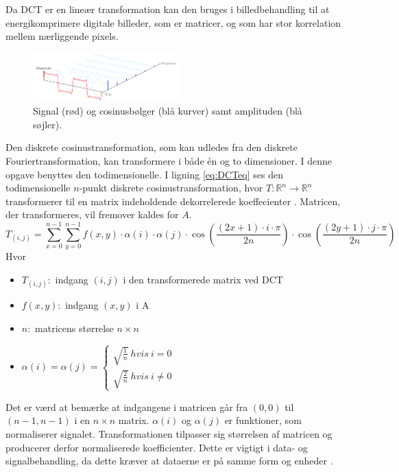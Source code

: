 Da DCT er en lineær transformation kan den bruges i billedbehandling til at energikomprimere digitale billeder, som er matricer, og som har stor korrelation mellem nærliggende pixels.
\begin{figure}[htbp]
\centering
\includegraphics[width=0.5\textwidth]{Billeder/frequencydomain.png}
\caption{Signal (rød) og cosinusbølger (blå kurver) samt amplituden (blå søjler).}
\label{fig:frequencydomain}
\end{figure} 
Den diskrete cosinustransformation, som kan udledes fra den diskrete Fouriertransformation, kan transformere i både én og to dimensioner. I denne opgave benyttes den todimensionelle. I ligning \vref{eq:DCTeq} ses den todimensionelle $n$-punkt diskrete cosinustransformation, hvor $T:\mathbb{R}^n \longrightarrow \mathbb{R}^n$ transformerer til en matrix indeholdende dekorrelerede koeffecienter \citep{guillermo_sapiro}. Matricen, der transformeres, vil fremover kaldes for $A$. 
\begin{equation}
T_{(i,j)}=\sum\limits_{x=0}^{n-1} \sum\limits_{y=0}^{n-1} f(x,y) \cdot \alpha(i) \cdot \alpha(j) \cdot \cos\left(\frac{(2x+1) \cdot i \cdot \pi}{2n}\right) \cdot \cos\left(\frac{(2y+1) \cdot j \cdot \pi}{2n}\right)
\label{eq:DCTeq}
\end{equation}
Hvor
\begin{itemize}
\item $T_{(i,j)}:$ indgang $(i,j)$ i den transformerede matrix ved DCT
\item $f(x,y):$ indgang $(x,y)$ i A
\item $n:$ matricens størrelse $n \times n$
\item $\alpha(i)=\alpha(j)= \begin{cases}
					\sqrt{\frac{1}{n}} \ hvis \ i = 0\\
					\sqrt{\frac{2}{n}} \ hvis \ i \neq 0
					\end{cases}$
\end{itemize}
Det er værd at bemærke at indgangene i matricen går fra $(0,0)$ til $(n-1,n-1)$ i en $n \times n$ matrix. $\alpha(i)$  og $\alpha(j)$ er funktioner, som normaliserer signalet. Transformationen tilpasser sig størrelsen af matricen og producerer derfor normaliserede koefficienter. Dette er vigtigt i data- og signalbehandling, da dette kræver at dataerne er på samme form og enheder \citep{normalization}.

